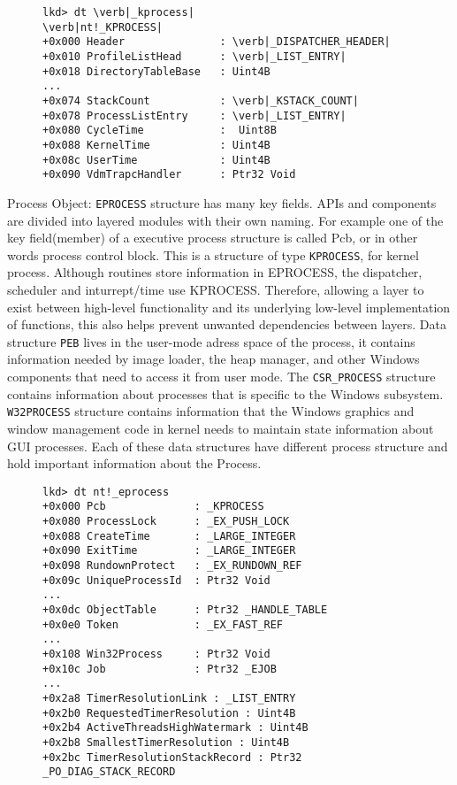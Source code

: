 \documentclass[letterpaper,10pt,draftclsnofoot,onecolumn]{IEEEtran}
\begin{document}
\begin{figure}[H]
\begin{lstlisting}
lkd> dt \verb|_kprocess|
\verb|nt!_KPROCESS|
+0x000 Header				: \verb|_DISPATCHER_HEADER|
+0x010 ProfileListHead 		: \verb|_LIST_ENTRY|
+0x018 DirectoryTableBase	: Uint4B
...
+0x074 StackCount			: \verb|_KSTACK_COUNT|
+0x078 ProcessListEntry 	: \verb|_LIST_ENTRY|
+0x080 CycleTime			:  Uint8B
+0x088 KernelTime			: Uint4B
+0x08c UserTime				: Uint4B
+0x090 VdmTrapcHandler		: Ptr32 Void
\end{lstlisting}
\end{figure}
Process Object: \verb|EPROCESS| structure has many key fields. APIs and components are divided into layered modules with their own naming. For example one of the key field(member) of a executive process structure is called Pcb, or in other words process control block. This is a structure of type \verb|KPROCESS|, for kernel process. Although routines store information in EPROCESS, the dispatcher, scheduler and inturrept/time use KPROCESS. Therefore, allowing a layer to exist between high-level functionality and its underlying low-level implementation of functions, this also helps prevent unwanted dependencies between layers. Data structure \verb|PEB| lives in the user-mode adress space of the process, it contains information needed by image loader, the heap manager, and other Windows components that need to access it from user mode. The \verb|CSR_PROCESS| structure contains information about processes that is specific to the Windows subsystem. \verb|W32PROCESS| structure contains information that the Windows graphics and window management code in kernel needs to maintain state information about GUI processes. Each of these data structures have different process structure and hold important information about the Process.
\begin{figure}[H]
\begin{lstlisting}
lkd> dt nt!_eprocess
+0x000 Pcb				: _KPROCESS
+0x080 ProcessLock		: _EX_PUSH_LOCK
+0x088 CreateTime		: _LARGE_INTEGER
+0x090 ExitTime			: _LARGE_INTEGER
+0x098 RundownProtect	: _EX_RUNDOWN_REF
+0x09c UniqueProcessId 	: Ptr32 Void
...
+0x0dc ObjectTable		: Ptr32 _HANDLE_TABLE
+0x0e0 Token			: _EX_FAST_REF
...
+0x108 Win32Process		: Ptr32 Void
+0x10c Job				: Ptr32 _EJOB
...
+0x2a8 TimerResolutionLink : _LIST_ENTRY
+0x2b0 RequestedTimerResolution : Uint4B	
+0x2b4 ActiveThreadsHighWatermark : Uint4B
+0x2b8 SmallestTimerResolution : Uint4B
+0x2bc TimerResolutionStackRecord : Ptr32 _PO_DIAG_STACK_RECORD
\end{lstlisting}
\end{figure}
\end{document}
